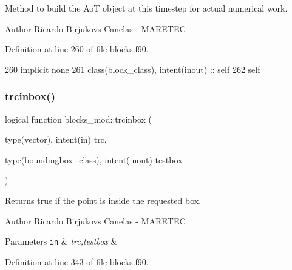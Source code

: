Method to build the AoT object at this timestep for actual numerical work. 

\begin{DoxyAuthor}{Author}
Ricardo Birjukovs Canelas -\/ M\+A\+R\+E\+T\+EC 
\end{DoxyAuthor}


Definition at line 260 of file blocks.\+f90.


\begin{DoxyCode}
260     \textcolor{keywordtype}{implicit none}
261     \textcolor{keywordtype}{class}(block\_class), \textcolor{keywordtype}{intent(inout)} :: self    
262     self%
\end{DoxyCode}
\mbox{\label{namespaceblocks__mod_ad8d92210b3d4ade090d2a19b97f4c88e}} 
\subsubsection{\texorpdfstring{trcinbox()}{trcinbox()}}
{\footnotesize\ttfamily logical function blocks\+\_\+mod\+::trcinbox (\begin{DoxyParamCaption}\item[{type(vector), intent(in)}]{trc,  }\item[{type(\mbox{\hyperlink{structboundingbox__mod_1_1boundingbox__class}{boundingbox\+\_\+class}}), intent(inout)}]{testbox }\end{DoxyParamCaption})\hspace{0.3cm}{\ttfamily [private]}}



Returns true if the point is inside the requested box. 

\begin{DoxyAuthor}{Author}
Ricardo Birjukovs Canelas -\/ M\+A\+R\+E\+T\+EC 
\end{DoxyAuthor}

\begin{DoxyParams}[1]{Parameters}
\mbox{\tt in}  & {\em trc,testbox} & \\
\hline
\end{DoxyParams}


Definition at line 343 of file blocks.\+f90.


